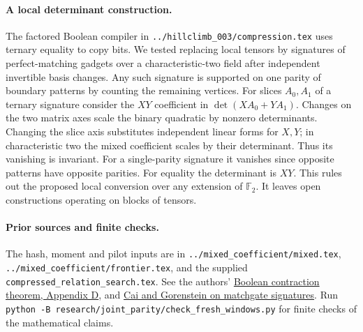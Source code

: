 \documentclass[11pt]{article}
\begin{document}
\paragraph{A local determinant construction.}
The factored Boolean compiler in \texttt{../hillclimb\_003/compression.tex}
uses ternary equality to copy bits. We tested replacing local tensors
by signatures of perfect-matching gadgets over a characteristic-two
field after independent invertible basis changes. Any such signature
is supported on one parity of boundary patterns by counting the
remaining vertices. For slices $A_0,A_1$ of a ternary signature
consider the $XY$ coefficient in $\det(XA_0+YA_1)$. Changes on the
two matrix axes scale the binary quadratic by nonzero determinants.
Changing the slice axis substitutes independent linear forms for
$X,Y$; in characteristic two the mixed coefficient scales by their
determinant. Thus its vanishing is invariant. For a single-parity
signature it vanishes since opposite patterns have opposite parities.
For equality the determinant is $XY$. This rules out the proposed
local conversion over any extension of $\mathbb F_2$. It leaves open
constructions operating on blocks of tensors.

\paragraph{Prior sources and finite checks.}
The hash, moment and pilot inputs are in \texttt{../mixed\_coefficient/mixed.tex},
\texttt{../mixed\_coefficient/frontier.tex}, and the supplied
\texttt{compressed\_relation\_search.tex}. See the authors'
\href{https://github.com/openai/math/blob/main/preprints/The-Exponential-Time-Hypothesis-is-False-October-25-2026/paper.pdf}
{Boolean contraction theorem, Appendix D}, and
\href{https://theoryofcomputing.org/articles/v010a007/}{Cai and Gorenstein
on matchgate signatures}. Run
\texttt{python -B research/joint\_parity/check\_fresh\_windows.py} for
finite checks of the mathematical claims.
\end{document}

